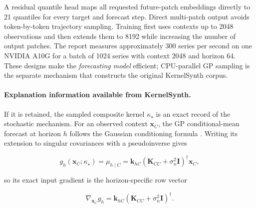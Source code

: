 A residual quantile head maps all requested future-patch embeddings directly
to 21 quantiles for every target and forecast step. Direct multi-patch output
avoids token-by-token trajectory sampling. Training first uses contexts up to
2048 observations and then extends them to 8192 while increasing the number of
output patches. The report measures approximately 300 series per second on one
NVIDIA A10G for a batch of 1024 series with context 2048 and horizon 64. These
designs make the \emph{forecasting model} efficient; CPU-parallel GP sampling
is the separate mechanism that constructs the original KernelSynth corpus.

\paragraph{Explanation information available from KernelSynth.}
If it is retained, the sampled composite kernel $\kappa_\star$ is an exact
record of the stochastic mechanism. For an observed context $\mathbf x_C$,
the GP conditional-mean forecast at horizon $h$ follows the Gaussian
conditioning formula \citep[Section~2.2, Eq.~(2.23)]{rasmussen2006gpml}.
Writing its extension to singular covariances with a pseudoinverse gives

\begin{equation}
g_h(\mathbf x_C;\kappa_\star)
=\mu_{h\mid C}
=\mathbf k_{hC}
  (\mathbf K_{CC}+\sigma_n^2\mathbf I)^\dagger\mathbf x_C,
\label{eq:gp-conditional-mean}
\end{equation}

so its exact input gradient is the horizon-specific row vector

\begin{equation}
\nabla_{\mathbf x_C}g_h
=\mathbf k_{hC}
 (\mathbf K_{CC}+\sigma_n^2\mathbf I)^\dagger.
\label{eq:gp-gradient}
\end{equation}

